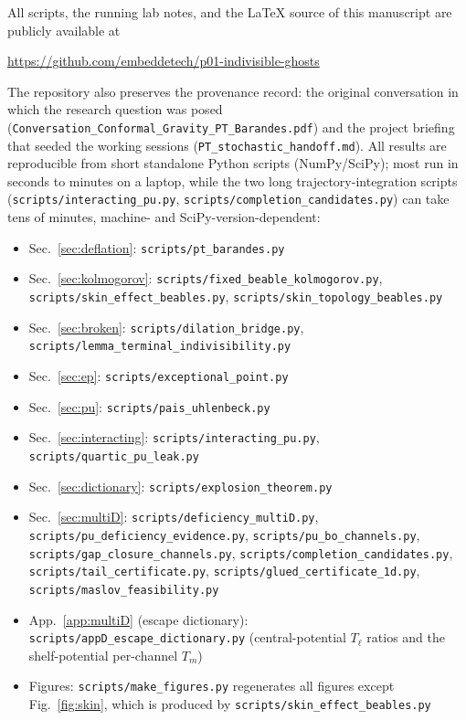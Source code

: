 \documentclass[11pt]{article}
\theoremstyle{definition}
\theoremstyle{remark}
\begin{document}
All scripts, the running lab notes, and the \LaTeX{} source of this
manuscript are publicly available at
\begin{center}
  \url{https://github.com/embeddetech/p01-indivisible-ghosts}
\end{center}
The repository also preserves the provenance record: the original
conversation in which the research question was posed
(\texttt{Conversation\_Conformal\_Gravity\_PT\_Barandes.pdf}) and the
project briefing that seeded the working sessions
(\texttt{PT\_stochastic\_handoff.md}).
All results are reproducible from short standalone Python scripts
(NumPy/SciPy); most run in seconds to minutes on a laptop, while the
two long trajectory-integration scripts (\texttt{scripts/interacting\_pu.py},
\texttt{scripts/completion\_candidates.py}) can take tens of minutes,
machine- and SciPy-version-dependent:
\begin{itemize}\setlength\itemsep{1pt}\raggedright
\item Sec.~\ref{sec:deflation}: \texttt{scripts/pt\_barandes.py}
\item Sec.~\ref{sec:kolmogorov}: \texttt{scripts/fixed\_beable\_kolmogorov.py},
  \texttt{scripts/skin\_effect\_beables.py}, \texttt{scripts/skin\_topology\_beables.py}
\item Sec.~\ref{sec:broken}: \texttt{scripts/dilation\_bridge.py},
  \texttt{scripts/lemma\_terminal\_indivisibility.py}
\item Sec.~\ref{sec:ep}: \texttt{scripts/exceptional\_point.py}
\item Sec.~\ref{sec:pu}: \texttt{scripts/pais\_uhlenbeck.py}
\item Sec.~\ref{sec:interacting}: \texttt{scripts/interacting\_pu.py},
  \texttt{scripts/quartic\_pu\_leak.py}
\item Sec.~\ref{sec:dictionary}: \texttt{scripts/explosion\_theorem.py}
\item Sec.~\ref{sec:multiD}: \texttt{scripts/deficiency\_multiD.py},
  \texttt{scripts/pu\_deficiency\_evidence.py}, \texttt{scripts/pu\_bo\_channels.py},
  \texttt{scripts/gap\_closure\_channels.py},
  \texttt{scripts/completion\_candidates.py}, \texttt{scripts/tail\_certificate.py},
  \texttt{scripts/glued\_certificate\_1d.py}, \texttt{scripts/maslov\_feasibility.py}
\item App.~\ref{app:multiD} (escape dictionary):
  \texttt{scripts/appD\_escape\_dictionary.py} (central-potential
  $T_{\ell}$ ratios and the shelf-potential per-channel $T_{m}$)
\item Figures: \texttt{scripts/make\_figures.py} regenerates all figures
  except Fig.~\ref{fig:skin}, which is produced by
  \texttt{scripts/skin\_effect\_beables.py}
\end{itemize}
\end{document}
